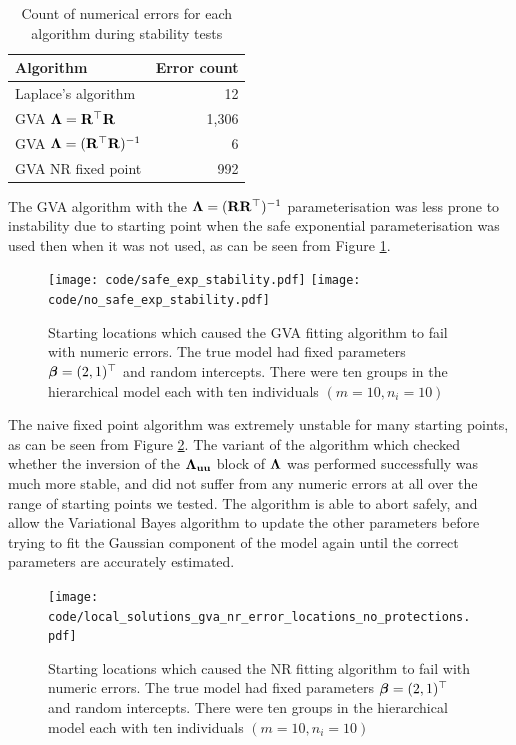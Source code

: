 \documentclass{amsart}[12pt]
\begin{document}
			\begin{table}
				\caption{Count of numerical errors for each algorithm during stability tests}
				\label{tab:stability_results}
				\begin{tabular}{|l|r|}
					\hline
					Algorithm                            & Error count \\
					\hline
					Laplace's algorithm                  & 12          \\
					GVA ${\boldsymbol \Lambda} = {\bf R}^\top {\bf R}$        & 1,306       \\
					GVA ${\boldsymbol \Lambda} = ({\bf R}^\top {\bf R})^{-1}$ & 6           \\
					GVA NR fixed point                   & 992         \\
					\hline
				\end{tabular}
			\end{table}

			The GVA algorithm with the ${\boldsymbol \Lambda} = ({\bf R} {\bf R}^\top)^{-1}$ parameterisation was less prone to
			instability due to starting point when the safe exponential parameterisation was used then when it was
			not used, as can be seen from Figure \ref{fig:stability_locations_gva}. %
					
			\begin{figure}
				\label{fig:stability_locations_gva}
				\caption{Starting locations which caused the GVA fitting algorithm to fail with numeric errors. The true model had fixed parameters ${\boldsymbol \beta} = (2, 1)^\top$ and random intercepts. There were ten groups in the
					hierarchical model each	with ten individuals $(m=10, n_i=10)$}
				\texttt{[image: code/safe\_exp\_stability.pdf]}
				\texttt{[image: code/no\_safe\_exp\_stability.pdf]}
			\end{figure}

			The naive fixed point algorithm was extremely unstable for many starting points, as can be seen from
			Figure \ref{fig:stability_locations_nr}. The variant of the algorithm which checked whether the
			inversion of the ${\boldsymbol \Lambda}_{{\bf u} {\bf u}}$ block of ${\boldsymbol \Lambda}$ was performed successfully was much more
			stable, and did not suffer from any numeric errors at all over the range of starting points we tested.
			The algorithm is able to abort safely, and allow the Variational Bayes algorithm to update the other
			parameters before trying to fit the Gaussian component of the model again until the correct parameters
			are accurately estimated.

			\begin{figure}
				\label{fig:stability_locations_nr}
				\caption{Starting locations which caused the NR fitting algorithm to fail with numeric errors. The true model 						had fixed parameters ${\boldsymbol \beta} = (2, 1)^\top$ and random intercepts. There were ten groups in the
					hierarchical model each	with ten individuals $(m=10, n_i=10)$}
				\texttt{[image: code/local\_solutions\_gva\_nr\_error\_locations\_no\_protections.pdf]}
			\end{figure}
			
\end{document}
